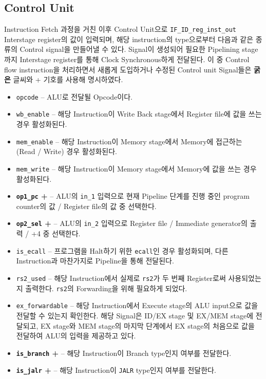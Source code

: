 \documentclass{scrartcl}
\begin{document}
\subsection{Control Unit}
Instruction Fetch 과정을 거친 이후 Control Unit으로 \texttt{IF\_ID\_reg\_inst\_out} Interstage register의 값이 입력되며, 해당 instruction의 type으로부터
다음과 같은 종류의 Control signal을 만들어낼 수 있다. Signal이 생성되어 필요한 Pipelining stage까지 Interstage register를 통해 Clock Synchronous하게 전달된다.
이 중 Control flow instruction을 처리하면서 새롭게 도입하거나 수정된 Control unit Signal들은 \textbf{굵은} 글씨와 + 기호를 사용해 명시하였다.

\begin{itemize}
  \item \texttt{opcode} -- ALU로 전달될 Opcode이다.
  \item \texttt{wb\_enable} -- 해당 Instruction이 Write Back stage에서 Register file에 값을 쓰는 경우 활성화된다.
  \item \texttt{mem\_enable} -- 해당 Instruction이 Memory stage에서 Memory에 접근하는 (Read / Write) 경우 활성화된다.
  \item \texttt{mem\_write} -- 해당 Instruction이 Memory stage에서 Memory에 값을 쓰는 경우 활성화된다.
  \item \textbf{\texttt{op1\_pc} +} -- ALU의 \texttt{in\_1} 입력으로 현재 Pipeline 단계를 진행 중인 program counter의 값 / Register file의 값 중 선택한다.
  \item \textbf{\texttt{op2\_sel} +} -- ALU의 \texttt{in\_2} 입력으로 Register file / Immediate generator의 출력 / +4 중 선택한다.
  \item \texttt{is\_ecall} -- 프로그램을 Halt하기 위한 \texttt{ecall}인 경우 활성화되며, 다른 Instruction과 마찬가지로 Pipeline을 통해 전달된다.
  \item \texttt{rs2\_used} -- 해당 Instruction에서 실제로 \texttt{rs2}가 두 번째 Register로써 사용되었는지 출력한다. \texttt{rs2}의 Forwarding을 위해 필요하게 되었다.
  \item \texttt{ex\_forwardable} -- 해당 Instruction에서 Execute stage의 ALU input으로 값을 전달할 수 있는지 확인한다. 해당 Signal은 ID/EX stage 및 EX/MEM stage에 전달되고, EX stage와 MEM stage의 마지막 단계에서 EX stage의 처음으로 값을 전달하여 ALU의 입력을 제공하고 있다.
  \item \textbf{\texttt{is\_branch} +} -- 해당 Instruction이 Branch type인지 여부를 전달한다.
  \item \textbf{\texttt{is\_jalr} +} -- 해당 Instruction이 \texttt{JALR} type인지 여부를 전달한다.
\end{itemize}
\end{document}
